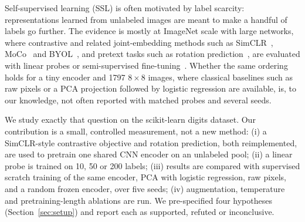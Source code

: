 Self-supervised learning (SSL) is often motivated by label scarcity: representations learned from unlabeled images are meant to make a handful of labels go further. The evidence is mostly at ImageNet scale with large networks, where contrastive and related joint-embedding methods such as SimCLR~\cite{chen2020simple}, MoCo~\cite{he2019momentum} and BYOL~\cite{grill2020bootstrap}, and pretext tasks such as rotation prediction~\cite{gidaris2018unsupervised}, are evaluated with linear probes or semi-supervised fine-tuning~\cite{zhai2019s,chen2020big}. Whether the same ordering holds for a tiny encoder and 1797 $8\times8$ images, where classical baselines such as raw pixels or a PCA projection followed by logistic regression are available, is, to our knowledge, not often reported with matched probes and several seeds.

We study exactly that question on the scikit-learn digits dataset. Our contribution is a small, controlled measurement, not a new method: (i) a SimCLR-style contrastive objective and rotation prediction, both reimplemented, are used to pretrain one shared CNN encoder on an unlabeled pool; (ii) a linear probe is trained on 10, 50 or 200 labels; (iii) results are compared with supervised scratch training of the same encoder, PCA with logistic regression, raw pixels, and a random frozen encoder, over five seeds; (iv) augmentation, temperature and pretraining-length ablations are run. We pre-specified four hypotheses (Section~\ref{sec:setup}) and report each as supported, refuted or inconclusive.
